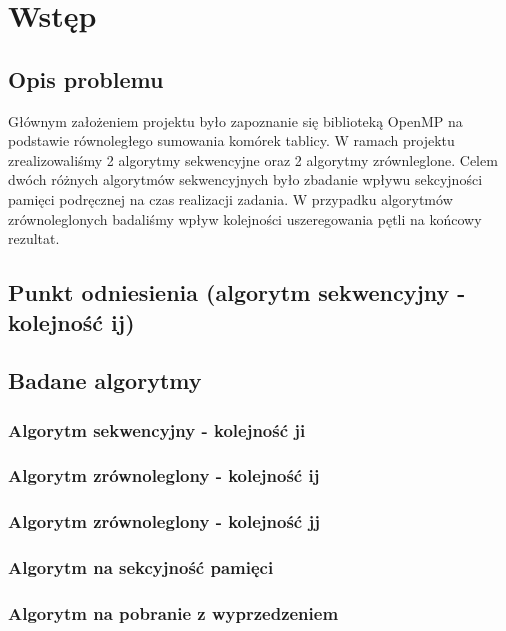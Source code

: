 \section{Wstęp}

\subsection{Opis problemu}

Głównym założeniem projektu było zapoznanie się biblioteką OpenMP na podstawie równoległego sumowania komórek tablicy. W ramach projektu zrealizowaliśmy 2 algorytmy sekwencyjne oraz 2 algorytmy zrównleglone. Celem dwóch różnych algorytmów sekwencyjnych było zbadanie wpływu sekcyjności pamięci podręcznej na czas realizacji zadania. W przypadku algorytmów zrównoleglonych badaliśmy wpływ kolejności uszeregowania pętli na końcowy rezultat.

\subsection{Punkt odniesienia (algorytm sekwencyjny - kolejność ij)}




\subsection{Badane algorytmy}


\subsubsection{Algorytm sekwencyjny - kolejność ji}




\subsubsection{Algorytm zrównoleglony - kolejność ij}




\subsubsection{Algorytm zrównoleglony - kolejność jj}




\subsubsection{Algorytm na sekcyjność pamięci}




\subsubsection{Algorytm na  pobranie  z wyprzedzeniem}



